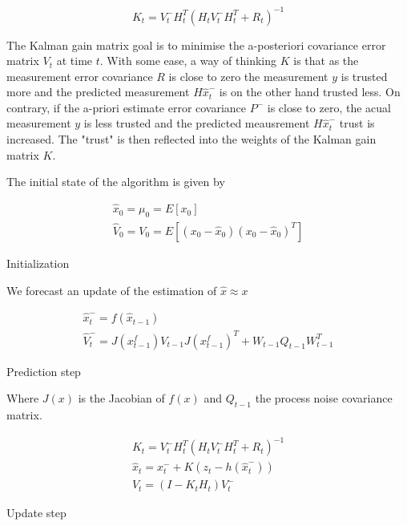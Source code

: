 \documentclass[mscthesis]{usiinfthesis}
\begin{document}
\[
K_t = V_t^- H^T_t (H_t V_t^- H^T_t + R_t)^{-1} 
\]

The Kalman gain matrix goal is to minimise the a-posteriori covariance error matrix $V_t$ at time $t$. With some ease, a way of thinking $K$ is that as the measurement error covariance $R$ is close to zero the measurement $y$ is trusted more and the predicted measurement $H\hat{x}_t^-$ is on the other hand trusted less. On contrary, if the a-priori estimate error covariance $P^-$ is close to zero, the acual measurement $y$ is less trusted and the predicted meausrement $H\hat{x}_t^-$ trust is increased. The "trust" is then reflected into the weights of the Kalman gain matrix $K$. 

The initial state of the algorithm is given by

\begin{eqfloat}
\begin{equation}
\begin{array}{l}
\hat{x}_0 = \mu_0 = E[x_0] \\
\hat{V}_0 = V_0 = E[(x_0-\hat{x}_0)(x_0-\hat{x}_0)^T] 
\end{array}
\label{eq:kalman_init}
\end{equation}
\caption{Initialization}
\end{eqfloat}

We forecast an update of the estimation of $\hat{x} \approx x$

\begin{eqfloat}
\begin{equation}
\begin{array}{l}
\hat{x}_t^- = f(\hat{x}_{t-1}) \\
\hat{V}_t^- = J(x^f_{t-1}) V_{t-1} J(x^f_{t-1})^T + W_{t-1} Q_{t-1} W_{t-1}^T
\end{array}
\label{eq:kalman_predict}
\end{equation}
\caption{Prediction step}
\end{eqfloat}

Where $J(x)$ is the Jacobian of $f(x)$ and $Q_{t-1}$ the process noise covariance matrix.


\begin{eqfloat}
\begin{equation}
\begin{array}{l}
K_t = V_t^- H^T_t (H_t V_t^- H^T_t + R_t)^{-1} \\
\hat{x}_t = x_t^- + K (z_t - h(\hat{x}_t^-)) \\
V_t = (I-K_t H_t)V_t^-
\end{array}
\label{eq:kalman_update}
\end{equation}
\caption{Update step}
\end{eqfloat}
\end{document}
